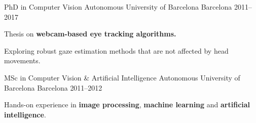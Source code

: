 

\begin{cventries}

  \cventry
    {PhD in Computer Vision} %
    {Autonomous University of Barcelona} %
    {Barcelona} %
    {2011--2017} %
    {
      \begin{cvitems} %
        \item {Thesis on \textbf{webcam-based eye tracking algorithms.}}
        \item {Exploring robust gaze estimation methods that are not affected by head movements.}
      \end{cvitems}
    }
    {}

  \cventry
    {MSc in Computer Vision \& Artificial Intelligence} %
    {Autonomous University of Barcelona} %
    {Barcelona} %
    {2011--2012} %
    {
      \begin{cvitems} %
        \item {Hands-on experience in \textbf{image processing}, \textbf{machine learning} and \textbf{artificial intelligence}.}
      \end{cvitems}
    }
    {}


\end{cventries}
